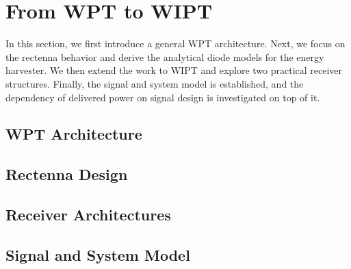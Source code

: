 \chapter{From WPT to WIPT}
In this section, we first introduce a general WPT architecture. Next, we focus on the rectenna behavior and derive the analytical diode models for the energy harvester. We then extend the work to WIPT and explore two practical receiver structures. Finally, the signal and system model is established, and the dependency of delivered power on signal design is investigated on top of it.

\section{WPT Architecture}\label{sec:wpt-architecture}
  

\section{Rectenna Design}\label{sec:rectenna-design}
  

\section{Receiver Architectures}\label{sec:receiver-architectures}
  

\section{Signal and System Model}\label{sec:signal-and-system-model}
   